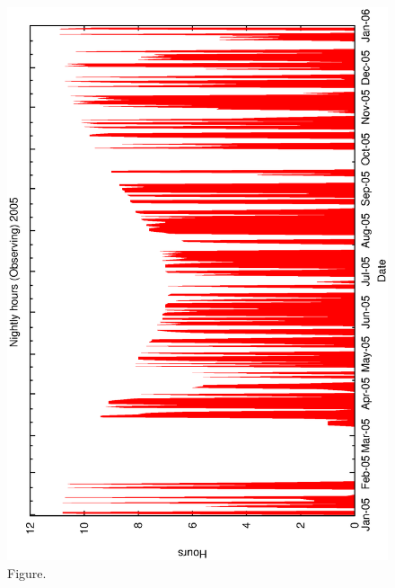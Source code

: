 \documentclass[12pt,a4paper]{article}
\begin{document}
\begin{figure}[htbp]
 \begin{center}
  \includegraphics[scale=1.0, angle=0]{figures/met_nightly_stats_obs2005.eps}
 \end{center}
  \caption[Figure.]
{Figure.}
\end{figure}
\clearpage
\end{document}
